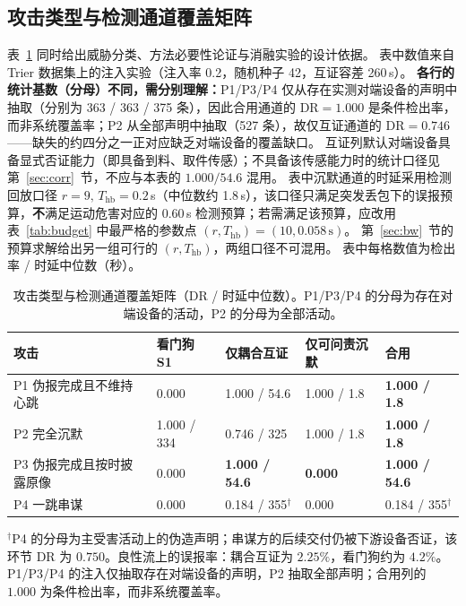 \documentclass[manuscript,screen,review]{acmart}
\newenvironment{tablenotes}{%
    \par\footnotesize
    \begin{list}{}{%
        \setlength{\leftmargin}{1.5em}%
        \setlength{\labelsep}{0.5em}%
        \setlength{\itemsep}{0pt}%
        \setlength{\parsep}{0pt}%
    }%
}{%
    \end{list}%
}
\begin{document}
\subsection{攻击类型与检测通道覆盖矩阵}
\label{sec:coverage}

表~\ref{tab:coverage} 同时给出威胁分类、方法必要性论证与消融实验的设计依据。
表中数值来自 Trier 数据集上的注入实验（注入率 0.2，随机种子 42，互证容差 260\,s）。
\textbf{各行的统计基数（分母）不同，需分别理解：}P1/P3/P4 仅从存在实测对端设备的声明中抽取（分别为 363 / 363 / 375 条），因此合用通道的 DR${=}1.000$ 是条件检出率，而非系统覆盖率；P2 从全部声明中抽取（527 条），故仅互证通道的 DR${=}0.746$——缺失的约四分之一正对应缺乏对端设备的覆盖缺口。
互证列默认对端设备具备显式否证能力（即具备到料、取件传感）；不具备该传感能力时的统计口径见第~\ref{sec:corr}~节，不应与本表的 $1.000/54.6$ 混用。
表中沉默通道的时延采用检测回放口径 $r{=}9,\,T_{\mathrm{hb}}{=}0.2$\,s（中位数约 1.8\,s），该口径只满足突发丢包下的误报预算，\textbf{不}满足运动危害对应的 $0.60$\,s 检测预算；若需满足该预算，应改用表~\ref{tab:budget} 中最严格的参数点 $(r,T_{\mathrm{hb}})=(10,0.058\,\mathrm{s})$。
第~\ref{sec:bw}~节的预算求解给出另一组可行的 $(r,T_{\mathrm{hb}})$，两组口径不可混用。
表中每格数值为检出率 / 时延中位数（秒）。

\begin{table}[t]
  \centering
  \caption{攻击类型与检测通道覆盖矩阵（DR / 时延中位数）。P1/P3/P4 的分母为存在对端设备的活动，P2 的分母为全部活动。}
  \label{tab:coverage}
  \begin{tabular}{@{}lllll@{}}
    \toprule
    攻击 & 看门狗 S1 & 仅耦合互证 & 仅可问责沉默 & \textbf{合用} \\
    \midrule
    P1 伪报完成且不维持心跳 & 0.000 & 1.000 / 54.6 & 1.000 / 1.8 & \textbf{1.000 / 1.8} \\
    P2 完全沉默 & 1.000 / 334 & 0.746 / 325 & 1.000 / 1.8 & \textbf{1.000 / 1.8} \\
    P3 伪报完成且按时披露原像 & 0.000 & \textbf{1.000 / 54.6} & \textbf{0.000} & \textbf{1.000 / 54.6} \\
    P4 一跳串谋 & 0.000 & 0.184 / 355$^{\dagger}$ & 0.000 & 0.184 / 355$^{\dagger}$ \\
    \bottomrule
  \end{tabular}
  \begin{tablenotes}
    \item $^{\dagger}$P4 的分母为主受害活动上的伪造声明；串谋方的后续交付仍被下游设备否证，该环节 DR 为 $0.750$。良性流上的误报率：耦合互证为 $2.25\%$，看门狗约为 $4.2\%$。P1/P3/P4 的注入仅抽取存在对端设备的声明，P2 抽取全部声明；合用列的 $1.000$ 为条件检出率，而非系统覆盖率。
  \end{tablenotes}
\end{table}
\end{document}

